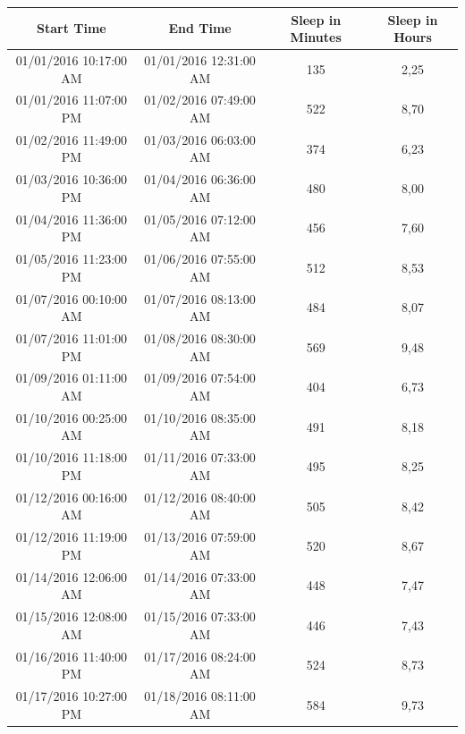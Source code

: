 \documentclass[12pt]{article} %
\begin{document}
\begin{table}[H]
\center
\begin{footnotesize}
	\begin{tabular}{| c | c | c | c |}
	\hline
	\textbf{Start Time} & \textbf{End Time} & \textbf{Sleep in Minutes} & \textbf{Sleep in Hours} \\
	\hline
01/01/2016 10:17:00 AM & 01/01/2016 12:31:00 AM	& 135 & 2,25\\
\hline
01/01/2016 11:07:00 PM & 01/02/2016 07:49:00 AM & 522 & 8,70\\
\hline
\colorbox{blue!20}{01/02/2016 11:49:00 PM} & \colorbox{blue!20}{01/03/2016 06:03:00 AM} & \colorbox{blue!20}{374} & \colorbox{blue!20}{6,23}\\
\hline
\colorbox{blue!30}{01/03/2016 10:36:00 PM} & \colorbox{blue!30}{01/04/2016 06:36:00 AM} & \colorbox{blue!30}{480} & \colorbox{blue!30}{8,00}\\
\hline
01/04/2016 11:36:00 PM & 01/05/2016 07:12:00 AM & 456 & 7,60\\
\hline
01/05/2016 11:23:00 PM & 01/06/2016 07:55:00 AM & 512 & 8,53\\
\hline
01/07/2016 00:10:00 AM & 01/07/2016 08:13:00 AM & 484 & 8,07\\
\hline
01/07/2016 11:01:00 PM & 01/08/2016 08:30:00 AM & 569 & 9,48\\
\hline
\colorbox{blue!20}{01/09/2016 01:11:00 AM} & \colorbox{blue!20}{01/09/2016 07:54:00 AM} & \colorbox{blue!20}{404} & \colorbox{blue!20}{6,73}\\
\hline
\colorbox{blue!30}{01/10/2016 00:25:00 AM} & \colorbox{blue!30}{01/10/2016 08:35:00 AM} & \colorbox{blue!30}{491} & \colorbox{blue!30}{8,18}\\
\hline
\colorbox{blue!30}{01/10/2016 11:18:00 PM} & \colorbox{blue!30}{01/11/2016 07:33:00 AM} & \colorbox{blue!30}{495} & \colorbox{blue!30}{8,25}\\
\hline
01/12/2016 00:16:00 AM & 01/12/2016 08:40:00 AM & 505 & 8,42\\
\hline
01/12/2016 11:19:00 PM & 01/13/2016 07:59:00 AM	& 520 & 8,67\\
\hline
01/14/2016 12:06:00 AM & 01/14/2016 07:33:00 AM	& 448 & 7,47\\
\hline
01/15/2016 12:08:00 AM & 01/15/2016 07:33:00 AM	& 446 & 7,43\\
\hline
\colorbox{blue!20}{01/16/2016 11:40:00 PM} & \colorbox{blue!20}{01/17/2016 08:24:00 AM} & \colorbox{blue!20}{524} & \colorbox{blue!20}{8,73}\\
\hline
\colorbox{blue!30}{01/17/2016 10:27:00 PM} & \colorbox{blue!30}{01/18/2016 08:11:00 AM} & \colorbox{blue!30}{584} & \colorbox{blue!30}{9,73}\\

\end{tabular}
\end{footnotesize}
\end{table}
\end{document}
